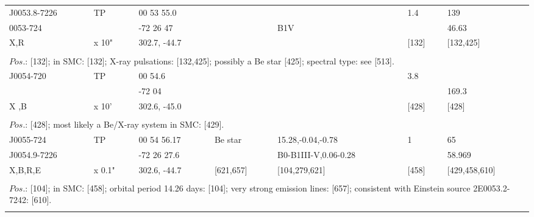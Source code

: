 \documentclass{aa}
\begin{document}
\begin{table*}[h]
\begin{tabular}{p{2.5cm}p{1cm}p{1.8cm}p{2.3cm}p{3.3cm}p{2.0cm}p{2.2cm}}
\noalign{\smallskip}
\hline
\noalign{\smallskip}
J0053.8-7226  &   TP        &  00 53 55.0       &                    &                    &      1.4           &   139   \\
0053-724          &                &   -72 26 47        &                    & B1V            &                       &    46.63  \\
 X,R                   &     x 10"  & 302.7, -44.7      &                    &                     &    [132]         &  [132,425]  \\
  
\\
\multicolumn{7}{p{17.5cm}}{
$Pos$.: [132];  in SMC: [132]; X-ray pulsations: [132,425]; possibly a Be star [425]; spectral type: see [513].}\\

\noalign{\smallskip}
\hline
\noalign{\smallskip}
J0054-720  &   TP       &     00 54.6            &                &             &    3.8              &                  \\
                     &               &         -72 04          &                &              &                       &  169.3      \\
  X ,B           &    x 10'   & 302.6, -45.0        &                &             &  [428]             &      [428]      \\
 
\\
\multicolumn{7}{p{17.5cm}}{  
$Pos$.: [428]; most likely a Be/X-ray system in SMC: [429].    }\\

\noalign{\smallskip}
\hline
\noalign{\smallskip}
J0055-724        &     TP    &  00 54 56.17      &  Be star         &      15.28,-0.04,-0.78     &  1                 & 65  \\
J0054.9-7226  &               &       -72 26 27.6  &                          &  B0-B1III-V,0.06-0.28  &                     &     58.969  \\
 X,B,R,E            &  x 0.1"  & 302.6, -44.7       &    [621,657]    &   [104,279,621]              &    [458]        &    [429,458,610]  \\
  
\\
\multicolumn{7}{p{17.5cm}}{
$Pos$.: [104]; in SMC: [458]; orbital period 14.26 days: [104]; very strong emission lines: [657]; consistent with 
Einstein source 2E0053.2-7242: [610].       }\\
\noalign{\smallskip} 


\end{tabular}
\end{table*}
\end{document}
